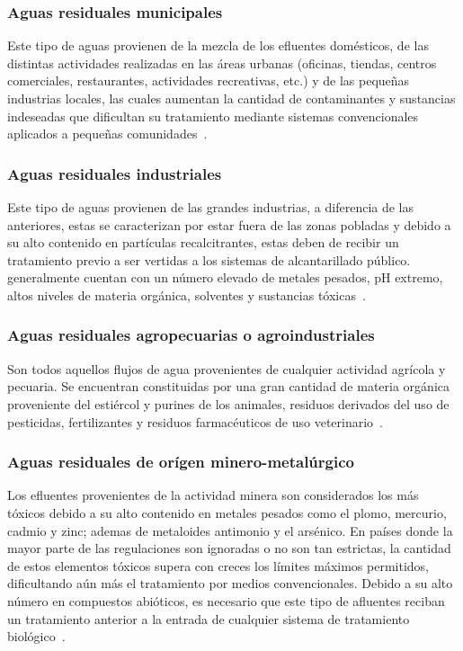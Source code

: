 \subsubsection*{Aguas residuales municipales}
Este tipo de aguas provienen de la mezcla de los \glspl{efluente} domésticos, de las distintas actividades realizadas en las áreas urbanas (oficinas, tiendas, centros comerciales, restaurantes, actividades recreativas, etc.) y de las pequeñas industrias locales, las cuales aumentan la cantidad de contaminantes y sustancias indeseadas que dificultan su tratamiento mediante sistemas convencionales aplicados a pequeñas comunidades~\citep{lazcano2016}.
\subsubsection*{Aguas residuales industriales}
Este tipo de aguas provienen de las grandes industrias, a diferencia de las anteriores, estas se caracterizan por estar fuera de las zonas pobladas y debido a su alto contenido en partículas recalcitrantes, estas deben de recibir un tratamiento previo a ser vertidas a los sistemas de alcantarillado público. generalmente cuentan con un número elevado de metales pesados, pH extremo, altos niveles de materia orgánica, solventes y sustancias tóxicas~\citep{lazcano2016}.
\subsubsection*{Aguas residuales agropecuarias o agroindustriales}
Son todos aquellos flujos de agua provenientes de cualquier actividad agrícola y pecuaria. Se encuentran constituidas por una gran cantidad de materia orgánica proveniente del estiércol y purines de los animales, residuos derivados del uso de pesticidas, fertilizantes y residuos farmacéuticos de uso veterinario~\citep{lazcano2016}.
\subsubsection*{Aguas residuales de orígen minero-metalúrgico}
Los efluentes provenientes de la actividad minera son considerados los más tóxicos debido a su alto contenido en metales pesados como el plomo, mercurio, cadmio y zinc; ademas de metaloides antimonio y el arsénico. En países donde la mayor parte de las regulaciones son ignoradas o no son tan estrictas, la cantidad de estos elementos tóxicos supera con creces los límites máximos permitidos, dificultando aún más el tratamiento por medios convencionales. Debido a su alto número en compuestos abióticos, es necesario que este tipo de afluentes reciban un tratamiento anterior a la entrada de cualquier sistema de tratamiento biológico~\citep{lazcano2016}.
